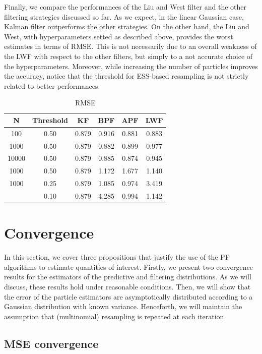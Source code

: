 \documentclass[
]{book}
\theoremstyle{break}
\theoremstyle{nonumberplain}
\begin{document}
Finally, we compare the performances of the Liu and West filter and the
other filtering strategies discussed so far. As we expect, in the linear
Gaussian case, Kalman filter outperforms the other strategies. On the
other hand, the Liu and West, with hyperparameters setted as described
above, provides the worst estimates in terms of RMSE. This is not
necessarily due to an overall weakness of the LWF with respect to the
other filters, but simply to a not accurate choice of the
hyperparameters. Moreover, while increasing the number of particles
improves the accuracy, notice that the threshold for ESS-based
resampling is not strictly related to better performances.

\begin{longtable}[t]{cccccc}
\caption{\label{tab:unnamed-chunk-30}RMSE}\\
\toprule
N & Threshold & KF & BPF & APF & LWF\\
\midrule
100 & 0.50 & 0.879 & 0.916 & 0.881 & 0.883\\
1000 & 0.50 & 0.879 & 0.882 & 0.899 & 0.977\\
10000 & 0.50 & 0.879 & 0.885 & 0.874 & 0.945\\
1000 & 0.50 & 0.879 & 1.172 & 1.677 & 1.140\\
1000 & 0.25 & 0.879 & 1.085 & 0.974 & 3.419\\
\addlinespace
1000 & 0.10 & 0.879 & 4.285 & 0.994 & 1.142\\
\bottomrule
\end{longtable}

\section{Convergence}\label{pf_converg}

In this section, we cover three propositions that justify the use of the
PF algorithms to estimate quantities of interest. Firstly, we present
two convergence results for the estimators of the predictive and
filtering distributions. As we will discuss, these results hold under
reasonable conditions. Then, we will show that the error of the particle
estimators are asymptotically distributed according to a Gaussian
distribution with known variance. Henceforth, we will maintain the
assumption that (multinomial) resampling is repeated at each iteration.

\subsection{MSE convergence}
\end{document}
